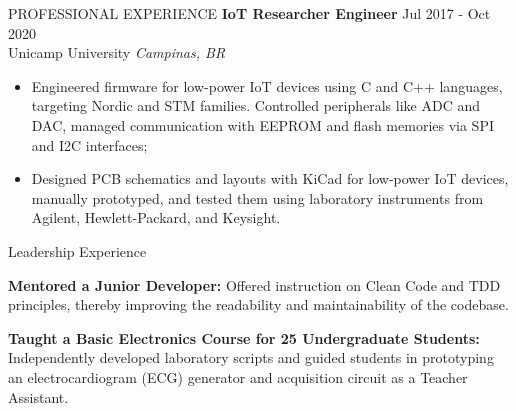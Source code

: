 \documentclass{resume} %
\begin{document}
\begin{rSection}{PROFESSIONAL EXPERIENCE}
\textbf{IoT Researcher Engineer} \hfill Jul 2017 - Oct 2020\\
Unicamp University \hfill \textit{Campinas, BR}
 \begin{itemize}
    \itemsep -3pt {} 
     \item Engineered firmware for low-power IoT devices using C and C++ languages, targeting Nordic and STM families. Controlled peripherals like ADC and DAC, managed communication with EEPROM and flash memories via SPI and I2C interfaces;
     \item Designed PCB schematics and layouts with KiCad for low-power IoT devices, manually prototyped, and tested them using laboratory instruments from Agilent, Hewlett-Packard, and Keysight.
 \end{itemize}

\end{rSection} 




\begin{rSection}{Leadership Experience} 
\vspace{-1.25em}
\item \textbf{Mentored a Junior Developer:} Offered instruction on Clean Code and TDD principles, thereby improving the readability and maintainability of the codebase.
\item \textbf{Taught a Basic Electronics Course for 25 Undergraduate Students:} Independently developed laboratory scripts and guided students in prototyping an electrocardiogram (ECG) generator and acquisition circuit as a Teacher Assistant.
\end{rSection}
\end{document}
